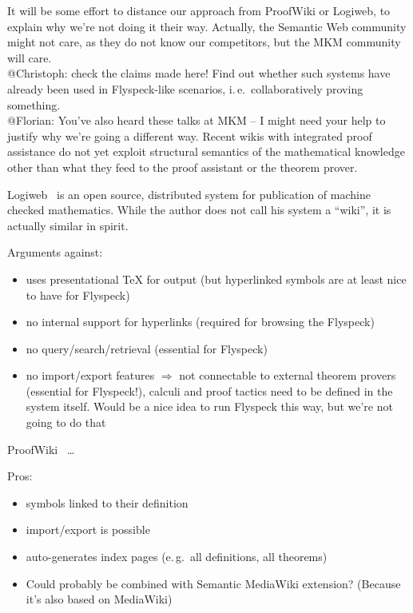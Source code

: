\documentclass{llncs}
\begin{document}
\begin{todo}{It will be some effort to distance our approach from ProofWiki or Logiweb,
  to explain why we're not doing it their way. Actually, the Semantic Web community might
  not care, as they do not know our competitors, but the MKM community will
  care.\\
  @Christoph: check the claims made here!  Find out whether such systems have already
  been used in Flyspeck-like scenarios, i.\,e.\ collaboratively proving something.\\
  @Florian: You've also heard these talks at MKM -- I might need your help to justify why
  we're going a different way.}  Recent wikis with integrated proof assistance do not yet
exploit structural semantics of the mathematical knowledge other than what they feed to
the proof assistant or the theorem prover.

  Logiweb~\cite{Grue:Logiweb07} is an open source, distributed system for publication of
  machine checked mathematics.  While the author does not call his system a ``wiki'', it
  is actually similar in spirit.

  Arguments against:
  \begin{itemize}
  \item uses presentational {\TeX} for output (but hyperlinked symbols are at least nice
    to have for Flyspeck)
  \item no internal support for hyperlinks (required for browsing the Flyspeck)
  \item no query/search/retrieval (essential for Flyspeck)
  \item no import/export features $\Rightarrow$ not connectable to external theorem
    provers (essential for Flyspeck!), calculi and proof tactics need to be defined in the
    system itself.  Would be a nice idea to run Flyspeck this way, but we're not going to
    do that
  \end{itemize}

  ProofWiki~\cite{CorKal:CoopReposFormalProofs07} \ldots

  Pros:
  \begin{itemize}
  \item symbols linked to their definition
  \item import/export is possible
  \item auto-generates index pages (e.\,g.\ all definitions, all theorems)
  \item Could probably be combined with Semantic MediaWiki extension?  (Because it's also
    based on MediaWiki)
  \end{itemize}


\end{todo}
\end{document}
